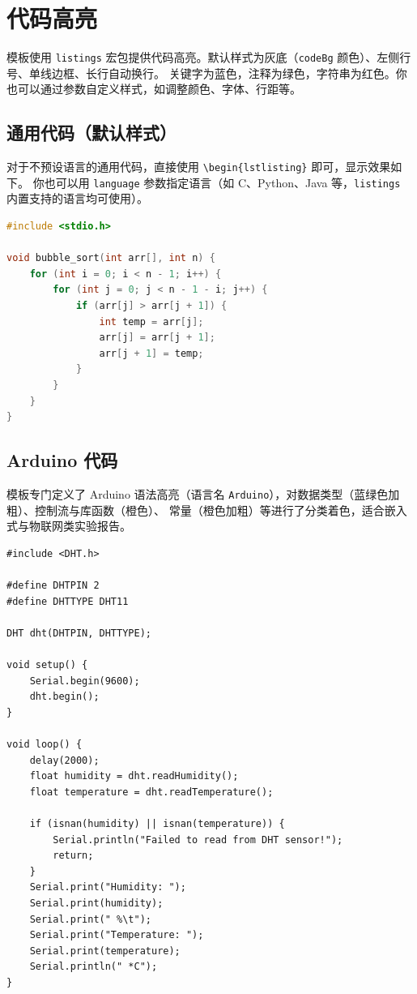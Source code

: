 \documentclass{sysu_report}
\begin{document}
\section{代码高亮}
模板使用 \texttt{listings} 宏包提供代码高亮。默认样式为灰底（\texttt{codeBg} 颜色）、左侧行号、单线边框、长行自动换行。
关键字为蓝色，注释为绿色，字符串为红色。你也可以通过参数自定义样式，如调整颜色、字体、行距等。
\subsection{通用代码（默认样式）}
对于不预设语言的通用代码，直接使用 \verb|\begin{lstlisting}| 即可，显示效果如下。
你也可以用 \verb|language| 参数指定语言（如 C、Python、Java 等，\texttt{listings} 内置支持的语言均可使用）。

\begin{lstlisting}[language=C, caption={冒泡排序 C 语言实现}]
#include <stdio.h>

void bubble_sort(int arr[], int n) {
    for (int i = 0; i < n - 1; i++) {
        for (int j = 0; j < n - 1 - i; j++) {
            if (arr[j] > arr[j + 1]) {
                int temp = arr[j];
                arr[j] = arr[j + 1];
                arr[j + 1] = temp;
            }
        }
    }
}
\end{lstlisting}

\subsection{Arduino 代码}
模板专门定义了 Arduino 语法高亮（语言名 \texttt{Arduino}），对数据类型（蓝绿色加粗）、控制流与库函数（橙色）、
常量（橙色加粗）等进行了分类着色，适合嵌入式与物联网类实验报告。

\begin{lstlisting}[language=Arduino, caption={Arduino 读取 DHT11 温湿度传感器}]
#include <DHT.h>

#define DHTPIN 2
#define DHTTYPE DHT11

DHT dht(DHTPIN, DHTTYPE);

void setup() {
    Serial.begin(9600);
    dht.begin();
}

void loop() {
    delay(2000);
    float humidity = dht.readHumidity();
    float temperature = dht.readTemperature();

    if (isnan(humidity) || isnan(temperature)) {
        Serial.println("Failed to read from DHT sensor!");
        return;
    }
    Serial.print("Humidity: ");
    Serial.print(humidity);
    Serial.print(" %\t");
    Serial.print("Temperature: ");
    Serial.print(temperature);
    Serial.println(" *C");
}
\end{lstlisting}
\end{document}
